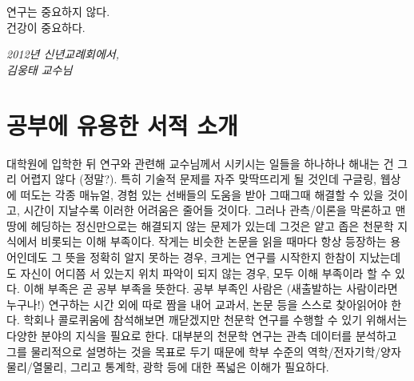 \epigraph{연구는 중요하지 않다.\\
          건강이 중요하다.}
 {\textit{2012년 신년교례회에서,\\ \textsc{김웅태 교수님}}}
  
\section{공부에 유용한 서적 소개}
대학원에 입학한 뒤 연구와 관련해 교수님께서 시키시는 일들을 하나하나 해내는 건
그리 어렵지 않다 (정말?).  특히 기술적 문제를 자주 맞딱뜨리게 될 것인데 구글링,
웹상에 떠도는 각종 매뉴얼, 경험 있는 선배들의 도움을 받아 그때그때 해결할 수 있을
것이고, 시간이 지날수록 이러한 어려움은 줄어들 것이다.  그러나 관측/이론을
막론하고 맨땅에 헤딩하는 정신만으로는 해결되지 않는 문제가 있는데 그것은 얕고
좁은 천문학 지식에서 비롯되는 이해 부족이다.  작게는 비슷한 논문을 읽을 때마다
항상 등장하는 용어인데도 그 뜻을 정확히 알지 못하는 경우, 크게는 연구를 시작한지
한참이 지났는데도 자신이 어디쯤 서 있는지 위치 파악이 되지 않는 경우, 모두 이해
부족이라 할 수 있다.  이해 부족은 곧 공부 부족을 뜻한다. 공부 부족인 사람은
(새출발하는 사람이라면 누구나!) 연구하는 시간 외에 따로 짬을 내어 교과서, 논문
등을 스스로 찾아읽어야 한다.  학회나 콜로퀴움에 참석해보면 깨닫겠지만 천문학
연구를 수행할 수 있기 위해서는 다양한 분야의 지식을 필요로 한다.  대부분의 천문학
연구는 관측 데이터를 분석하고 그를 물리적으로 설명하는 것을 목표로 두기 때문에
학부 수준의 역학/전자기학/양자물리/열물리, 그리고 통계학, 광학 등에 대한 폭넓은
이해가 필요하다.

